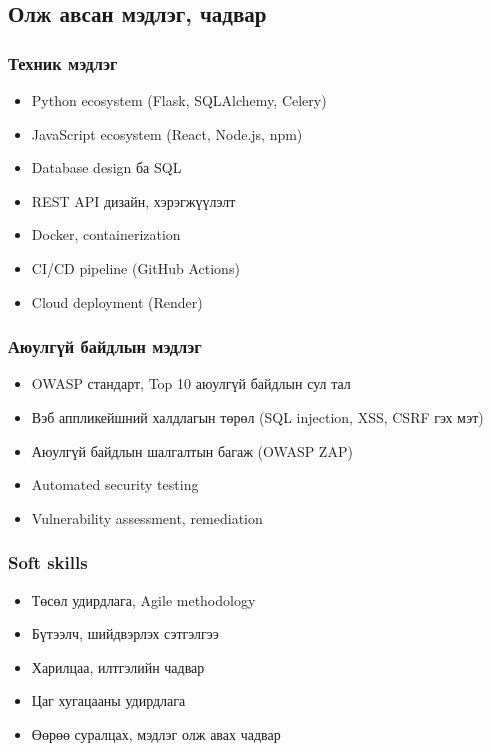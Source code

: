 \documentclass[main.tex]{subfiles}
\begin{document}
\subsection{Олж авсан мэдлэг, чадвар}

\subsubsection{Техник мэдлэг}
\begin{itemize}
    \item Python ecosystem (Flask, SQLAlchemy, Celery)
    \item JavaScript ecosystem (React, Node.js, npm)
    \item Database design ба SQL
    \item REST API дизайн, хэрэгжүүлэлт
    \item Docker, containerization
    \item CI/CD pipeline (GitHub Actions)
    \item Cloud deployment (Render)
\end{itemize}

\subsubsection{Аюулгүй байдлын мэдлэг}
\begin{itemize}
    \item OWASP стандарт, Top 10 аюулгүй байдлын сул тал
    \item Вэб аппликейшний халдлагын төрөл (SQL injection, XSS, CSRF гэх мэт)
    \item Аюулгүй байдлын шалгалтын багаж (OWASP ZAP)
    \item Automated security testing
    \item Vulnerability assessment, remediation
\end{itemize}

\subsubsection{Soft skills}
\begin{itemize}
    \item Төсөл удирдлага, Agile methodology
    \item Бүтээлч, шийдвэрлэх сэтгэлгээ
    \item Харилцаа, илтгэлийн чадвар
    \item Цаг хугацааны удирдлага
    \item Өөрөө суралцах, мэдлэг олж авах чадвар
\end{itemize}
\end{document}
